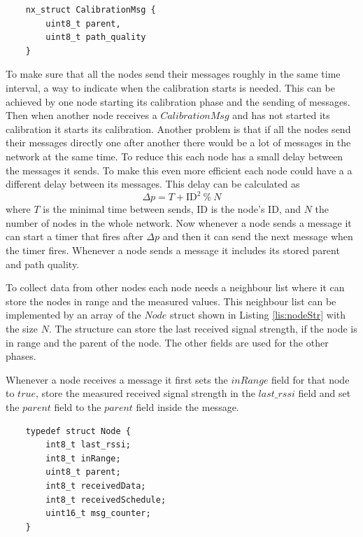 \begin{lstlisting}
	nx_struct CalibrationMsg {
		uint8_t parent,
		uint8_t path_quality
	}
\end{lstlisting}

To make sure that all the nodes send their messages roughly in the same time interval, a way to indicate when the calibration starts is needed. This can be achieved by one node starting its calibration phase and the sending of messages. Then when another node receives a $CalibrationMsg$ and has not started its calibration it starts its calibration. Another problem is that if all the nodes send their messages directly one after another there would be a lot of messages in the network at the same time. To reduce this each node has a small delay between the messages it sends. To make this even more efficient each node could have a a different delay between its messages. This delay can be calculated as  
\[ \Delta p = T + \mbox{ID}^2\ \%\ N\]
where $T$ is the minimal time between sends, ID is the node's ID, and $N$ the number of nodes in the whole network. Now whenever a node sends a message it can start a timer that fires after $\Delta p$ and then it can send the next message when the timer fires. Whenever a node sends a message it includes its stored parent and path quality.  

To collect data from other nodes each node needs a neighbour list where it can store the nodes in range and the measured values. This neighbour list can be implemented by an array of the $Node$ struct shown in Listing \ref{lis:nodeStr} with the size $N$. The structure can store the last received signal strength, if the node is in range and the parent of the node. The other fields are used for the other phases. 

Whenever a node receives a message it first sets the $inRange$ field for that node to $true$, store the measured received signal strength in the $last\_rssi$ field and set the $parent$ field to the $parent$ field inside the message. 
 

\begin{lstlisting}
	typedef struct Node {
  		int8_t last_rssi;
  		int8_t inRange;
  		uint8_t parent;
  		int8_t receivedData;
  		int8_t receivedSchedule;
  		uint16_t msg_counter;
	}
\end{lstlisting}

